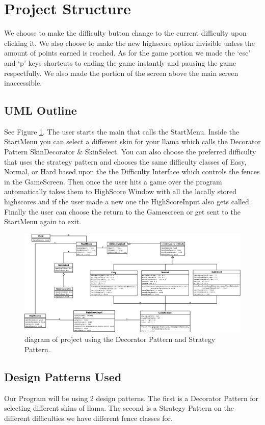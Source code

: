 \documentclass[10pt,conference,onecolumn,compsoc]{IEEEtran}
\begin{document}
\section{Project Structure}
We choose to make the difficulty button change to the current difficulty upon clicking it. We also choose to make the new highscore option invisible unless the amount of points earned is reached.
As for the game portion we made the `esc' and `p' keys shortcuts to ending the game instantly and pausing the game respectfully. We also made the portion of the screen above the main screen inaccessible.

\subsection{UML Outline}
See Figure \ref{dia}. The user starts the main that calls the StartMenu. Inside the StartMenu you can select a different skin for your llama which calls the Decorator Pattern SkinDecorator \& SkinSelect. You can also choose the preferred difficulty that uses the strategy pattern and chooses the same difficulty classes of Easy, Normal, or Hard based upon the the Difficulty Interface which controls the fences in the GameScreen. Then once the user hits a game over the program automatically takes them to HighScore Window with all the locally stored highscores and if the user made a new one the HighScoreInput also gets called. Finally the user can choose the return to the Gamescreen or get sent to the StartMenu again to exit.

\begin{figure}
\includegraphics[scale=0.3]{LeapingLlamas.png}
\caption{diagram of project using the Decorator Pattern and Strategy Pattern.}
\label{dia}
\end{figure}

\subsection{Design Patterns Used}
Our Program will be using 2 design patterns. The first is a Decorator Pattern for selecting different skins of llama. The second is a Strategy Pattern on the different difficulties we have different fence classes for.
\end{document}
